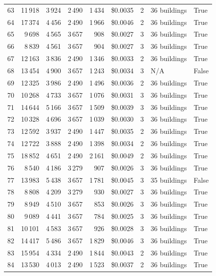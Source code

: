 \documentclass[a4paper,11pt]{article}
\begin{document}
\begin{table}[ht]
\begin{tabular}{r r r r r r r p{3cm} l}
63 & 11\,918 & 3\,924 & 2\,490 & 1\,434 & \$0.0035 & 2 & 36 buildings & True \\
64 & 17\,374 & 4\,456 & 2\,490 & 1\,966 & \$0.0046 & 2 & 36 buildings & True \\
65 & 9\,698 & 4\,565 & 3\,657 & 908 & \$0.0027 & 3 & 36 buildings & True \\
66 & 8\,839 & 4\,561 & 3\,657 & 904 & \$0.0027 & 3 & 36 buildings & True \\
67 & 12\,163 & 3\,836 & 2\,490 & 1\,346 & \$0.0033 & 2 & 36 buildings & True \\
68 & 13\,454 & 4\,900 & 3\,657 & 1\,243 & \$0.0034 & 3 & N/A & False \\
69 & 12\,325 & 3\,986 & 2\,490 & 1\,496 & \$0.0036 & 2 & 36 buildings & True \\
70 & 10\,268 & 4\,733 & 3\,657 & 1\,076 & \$0.0031 & 3 & 36 buildings & True \\
71 & 14\,644 & 5\,166 & 3\,657 & 1\,509 & \$0.0039 & 3 & 36 buildings & True \\
72 & 10\,328 & 4\,696 & 3\,657 & 1\,039 & \$0.0030 & 3 & 36 buildings & True \\
73 & 12\,592 & 3\,937 & 2\,490 & 1\,447 & \$0.0035 & 2 & 36 buildings & True \\
74 & 12\,722 & 3\,888 & 2\,490 & 1\,398 & \$0.0034 & 2 & 36 buildings & True \\
75 & 18\,852 & 4\,651 & 2\,490 & 2\,161 & \$0.0049 & 2 & 36 buildings & True \\
76 & 8\,540 & 4\,186 & 3\,279 & 907 & \$0.0026 & 3 & 36 buildings & True \\
77 & 13\,983 & 5\,438 & 3\,657 & 1\,781 & \$0.0045 & 3 & 35 buildings & False \\
78 & 8\,808 & 4\,209 & 3\,279 & 930 & \$0.0027 & 3 & 36 buildings & True \\
79 & 8\,949 & 4\,510 & 3\,657 & 853 & \$0.0026 & 3 & 36 buildings & True \\
80 & 9\,089 & 4\,441 & 3\,657 & 784 & \$0.0025 & 3 & 36 buildings & True \\
81 & 10\,101 & 4\,583 & 3\,657 & 926 & \$0.0028 & 3 & 36 buildings & True \\
82 & 14\,417 & 5\,486 & 3\,657 & 1\,829 & \$0.0046 & 3 & 36 buildings & True \\
83 & 15\,954 & 4\,334 & 2\,490 & 1\,844 & \$0.0043 & 2 & 36 buildings & True \\
84 & 13\,530 & 4\,013 & 2\,490 & 1\,523 & \$0.0037 & 2 & 36 buildings & True \\

\end{tabular}
\end{table}
\end{document}
